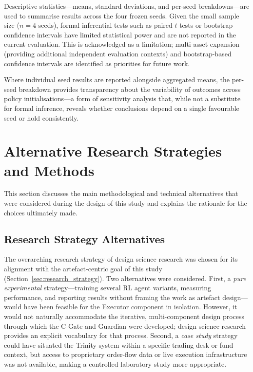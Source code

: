 Descriptive statistics---means, standard deviations, and per-seed
breakdowns---are used to summarise results across the four frozen seeds.
Given the small sample size ($n = 4$ seeds), formal inferential tests such as
paired $t$-tests or bootstrap confidence intervals have limited statistical
power and are not reported in the current evaluation. This is acknowledged as a
limitation; multi-asset expansion (providing additional independent evaluation
contexts) and bootstrap-based confidence intervals are identified as priorities
for future work.

Where individual seed results are reported alongside aggregated means, the
per-seed breakdown provides transparency about the variability of outcomes
across policy initialisations---a form of sensitivity analysis that, while not
a substitute for formal inference, reveals whether conclusions depend on a
single favourable seed or hold consistently.

\section{Alternative Research Strategies and Methods}
\label{sec:alternatives}

This section discusses the main methodological and technical alternatives that were considered during the design of this study and explains the rationale for the choices ultimately made.

\subsection{Research Strategy Alternatives}

The overarching research strategy of design science research was chosen for its alignment with the artefact-centric goal of this study (Section~\ref{sec:research_strategy}). Two alternatives were considered. First, a \emph{pure experimental} strategy---training several RL agent variants, measuring performance, and reporting results without framing the work as artefact design---would have been feasible for the Executor component in isolation. However, it would not naturally accommodate the iterative, multi-component design process through which the C-Gate and Guardian were developed; design science research provides an explicit vocabulary for that process. Second, a \emph{case study} strategy could have situated the Trinity system within a specific trading desk or fund context, but access to proprietary order-flow data or live execution infrastructure was not available, making a controlled laboratory study more appropriate.

